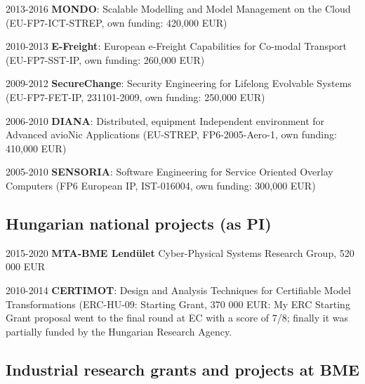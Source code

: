 \begin{yearlist}
\item[2013-2016] \textbf{MONDO}: Scalable Modelling and Model Management on the Cloud (EU-FP7-ICT-STREP, own funding: 420,000 EUR) 
\item[2010-2013] \textbf{E-Freight}: European e-Freight Capabilities for Co-modal Transport (EU-FP7-SST-IP, own funding: 260,000 EUR) 
\item[2009-2012] \textbf{SecureChange}: Security Engineering for Lifelong Evolvable Systems (EU-FP7-FET-IP, 231101-2009, own funding: 250,000 EUR) 
\item[2006-2010] \textbf{DIANA}: Distributed, equipment Independent environment for Advanced avioNic Applications (EU-STREP, FP6-2005-Aero-1, own funding: 410,000 EUR) 
\item[2005-2010] \textbf{SENSORIA}: Software Engineering for Service Oriented
Overlay Computers (FP6 European IP, IST-016004, own funding: 300,000 EUR)  
\end{yearlist}


\subsection{Hungarian national projects (as PI)}

\begin{yearlist}
\item[2015-2020] \textbf{MTA-BME Lend\"ulet} Cyber-Physical Systems Research Group, 520 000 EUR
\item[2010-2014] \textbf{CERTIMOT}: Design and Analysis Techniques for Certifiable Model Transformations (ERC-HU-09: Starting Grant, 370 000 EUR: My ERC Starting Grant proposal went to the final round at EC with a score of 7/8;
finally it was partially funded by the Hungarian Research Agency.
\end{yearlist}



\subsection{Industrial research grants and projects at BME} 

